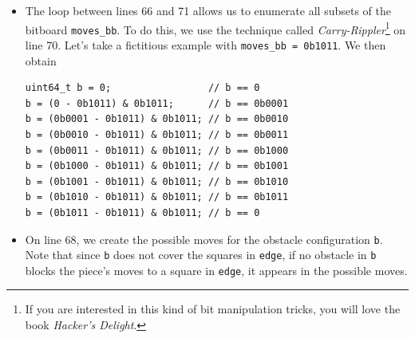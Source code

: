 \documentclass[12pt,a4paper,twoside,openright]{book}
\begin{document}
\begin{itemize}
\begin{itemize}
\begin{itemize}
\item The loop between lines 66 and 71 allows us to enumerate all subsets of the bitboard \texttt{moves_bb}. To do this, we use the technique called \emph{Carry-Rippler}\footnote{If you are interested in this kind of bit manipulation tricks, you will love the book \emph{Hacker's Delight}\cite{warren2012hackersdelight}.} on line 70. Let's take a fictitious example with \texttt{moves_bb = 0b1011}. We then obtain
\begin{verbatim}
uint64_t b = 0;                 // b == 0
b = (0 - 0b1011) & 0b1011;      // b == 0b0001
b = (0b0001 - 0b1011) & 0b1011; // b == 0b0010
b = (0b0010 - 0b1011) & 0b1011; // b == 0b0011
b = (0b0011 - 0b1011) & 0b1011; // b == 0b1000
b = (0b1000 - 0b1011) & 0b1011; // b == 0b1001
b = (0b1001 - 0b1011) & 0b1011; // b == 0b1010
b = (0b1010 - 0b1011) & 0b1011; // b == 0b1011
b = (0b1011 - 0b1011) & 0b1011; // b == 0
\end{verbatim}

\vspace{0.3cm}

\item On line 68, we create the possible moves for the obstacle configuration \texttt{b}. Note that since \texttt{b} does not cover the squares in \texttt{edge}, if no obstacle in \texttt{b} blocks the piece's moves to a square in \texttt{edge}, it appears in the possible moves.

\end{itemize}


\end{itemize}
\end{itemize}
\end{document}
